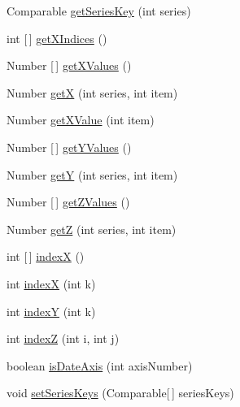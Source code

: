 \begin{DoxyCompactItemize}
\item 
Comparable \mbox{\hyperlink{classorg_1_1jfree_1_1data_1_1contour_1_1_default_contour_dataset_a7649ebc4fa2a7139ea601385e0acbdae}{get\+Series\+Key}} (int series)
\item 
int \mbox{[}$\,$\mbox{]} \mbox{\hyperlink{classorg_1_1jfree_1_1data_1_1contour_1_1_default_contour_dataset_a69fe875df187cabb1860f0ed79934d85}{get\+X\+Indices}} ()
\item 
Number \mbox{[}$\,$\mbox{]} \mbox{\hyperlink{classorg_1_1jfree_1_1data_1_1contour_1_1_default_contour_dataset_a8a4966b63f2a288bf72c93d8c00341b7}{get\+X\+Values}} ()
\item 
Number \mbox{\hyperlink{classorg_1_1jfree_1_1data_1_1contour_1_1_default_contour_dataset_a4971da895c3ca3722fbf01cc40dd9124}{getX}} (int series, int item)
\item 
Number \mbox{\hyperlink{classorg_1_1jfree_1_1data_1_1contour_1_1_default_contour_dataset_ad62b4e62c2b80a704db8af964ffa0409}{get\+X\+Value}} (int item)
\item 
Number \mbox{[}$\,$\mbox{]} \mbox{\hyperlink{classorg_1_1jfree_1_1data_1_1contour_1_1_default_contour_dataset_a0f3d5f992c8fdb948d8d07d5d4058ef9}{get\+Y\+Values}} ()
\item 
Number \mbox{\hyperlink{classorg_1_1jfree_1_1data_1_1contour_1_1_default_contour_dataset_a8afdda497f72a548bbc43a066f86a28b}{getY}} (int series, int item)
\item 
Number \mbox{[}$\,$\mbox{]} \mbox{\hyperlink{classorg_1_1jfree_1_1data_1_1contour_1_1_default_contour_dataset_aeab7352c99dfe7e6ebff00064e8d7ce0}{get\+Z\+Values}} ()
\item 
Number \mbox{\hyperlink{classorg_1_1jfree_1_1data_1_1contour_1_1_default_contour_dataset_a47bf3f8c5cf2bb06f7243b2e159c3978}{getZ}} (int series, int item)
\item 
int \mbox{[}$\,$\mbox{]} \mbox{\hyperlink{classorg_1_1jfree_1_1data_1_1contour_1_1_default_contour_dataset_ad34ac76cd3de6d536cd7581702c4a2d6}{indexX}} ()
\item 
int \mbox{\hyperlink{classorg_1_1jfree_1_1data_1_1contour_1_1_default_contour_dataset_a1e42fbe7ed58e5d5245dcc28f60c5f9b}{indexX}} (int k)
\item 
int \mbox{\hyperlink{classorg_1_1jfree_1_1data_1_1contour_1_1_default_contour_dataset_a02cb72764674f73faec5ba7574877098}{indexY}} (int k)
\item 
int \mbox{\hyperlink{classorg_1_1jfree_1_1data_1_1contour_1_1_default_contour_dataset_af469d3341c6f25053e4bfde103746620}{indexZ}} (int i, int j)
\item 
boolean \mbox{\hyperlink{classorg_1_1jfree_1_1data_1_1contour_1_1_default_contour_dataset_ad9fe2cd6959003ca651206b20e19c70d}{is\+Date\+Axis}} (int axis\+Number)
\item 
void \mbox{\hyperlink{classorg_1_1jfree_1_1data_1_1contour_1_1_default_contour_dataset_a1ce4a5d83bb51d49ca57ed24bc9b7087}{set\+Series\+Keys}} (Comparable\mbox{[}$\,$\mbox{]} series\+Keys)
\end{DoxyCompactItemize}
